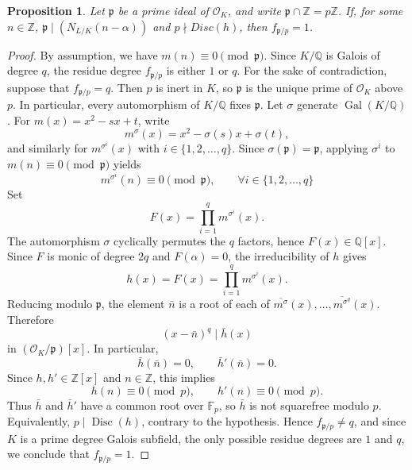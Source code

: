 \documentclass[11pt]{amsart}
\numberwithin{equation}{section}
\newtheorem{proposition}[algorithm]{Proposition}
\theoremstyle{definition}
\newcommand{\ZZ}{\mathbb{Z}}
\newcommand{\QQ}{\mathbb{Q}}
\begin{document}
\begin{proposition}
\label{prop: residue_degree}
   Let $\mathfrak p$ be a prime ideal of $\mathcal O_K$, and write $\mathfrak p\cap\ZZ=p\ZZ$. If, for some $n\in\ZZ$,
$
\mathfrak p \mid (N_{L/K}(n - \alpha))
$
and $p\nmid Disc(h)$, then $f_{\mathfrak p/p}=1$.
\end{proposition}
\begin{proof}
    By assumption, we have 
    $
        m(n)\equiv 0 \pmod{\mathfrak p}.
    $
    Since \(K/\QQ\) is Galois of degree \( q \), the residue degree
    \(f_{\mathfrak p/p}\) is either \( 1 \) or \( q \). For the sake of contradiction, suppose
    that \(f_{\mathfrak p/p} = q\). Then \( p \) is inert in \(K\), so
    \(\mathfrak p\) is the unique prime of \(\mathcal{O}_K\) above \(p\). In particular,
    every automorphism of \(K/\QQ\) fixes \(\mathfrak p\).
    Let \(\sigma\) generate \(\operatorname{Gal}(K/\QQ)\). For
    \(m(x)=x^2-sx+t\), write
    \[
        m^\sigma(x)=x^2-\sigma(s)x+\sigma(t),
    \]
    and similarly for \(m^{\sigma^i}(x)\) with $ i \in \{1,2,\dots, q\}$. Since
    \(\sigma(\mathfrak p)=\mathfrak p\), applying \(\sigma^i\) to
    \(m(n)\equiv0\pmod{\mathfrak p}\) yields
    \[
        m^{\sigma^i}(n)\equiv0\pmod{\mathfrak p},\qquad \forall{i \in \{1,2,\dots, q\}}
    \]
    Set
    \[
        F(x)=\prod_{i =1}^qm^{\sigma^i}(x).
    \]
    The automorphism \(\sigma\) cyclically permutes the $q$ factors, hence
    \(F(x)\in\QQ[x]\). Since \(F\) is monic of degree \(2q\) and \(F(\alpha)=0\),
    the irreducibility of \(h\) gives
    \begin{equation}
    \label{eq:h-factorization}
        h(x) = F(x) = \prod_{i =1}^qm^{\sigma^i}(x).
    \end{equation}
    Reducing modulo \(\mathfrak p\), the element \(\bar n\) is a root of each of
     \(\overline{m^\sigma}(x),\dots, \overline{m^{\sigma^q}}(x) \). Therefore
    \[
        (x-\bar n)^q\mid \bar h(x)
    \]
    in \((\mathcal{O}_K/\mathfrak p)[x]\). In particular,
    \[
        \bar h(\bar n)=0,\qquad \bar h'(\bar n)=0.
    \]
    Since \(h,h'\in\ZZ[x]\) and \(n\in\ZZ\), this implies
    \[
        h(n)\equiv0\pmod p,\qquad h'(n)\equiv0\pmod p.
    \]
    Thus \(\bar h\) and \(\bar h'\) have a common root over \(\mathbb F_p\), so
    \(\bar h\) is not squarefree modulo \(p\). Equivalently,
        $p\mid\operatorname{Disc}(h)$,
    contrary to the hypothesis. Hence \(f_{\mathfrak p/p}\neq q\), and since $K$ is a prime degree Galois subfield, the
    only possible residue degrees are \(1\) and \(q\), we conclude that
    \(f_{\mathfrak p/p}=1\).
\end{proof}
\end{document}
